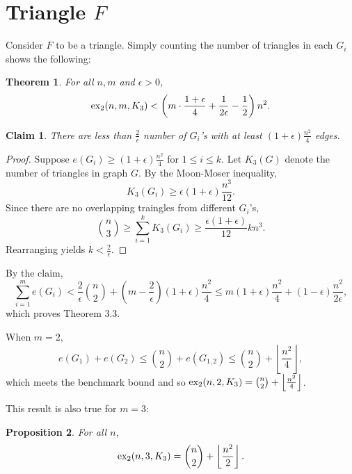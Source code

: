 \documentclass[12pt]{report}
\newtheorem{theorem}{Theorem}[chapter]
\newtheorem{claim}{Claim}[theorem]
\newtheorem{proposition}[theorem]{Proposition}
\newcommand*{\dex}{\textnormal{ex}_2}
\begin{document}
\section{Triangle $F$}

Consider $F$ to be a triangle. Simply counting the number of triangles in each $G_i$ shows the following:

\begin{theorem}
  For all $n, m$ and $\epsilon > 0$,
  \[
    \dex(n, m, K_3) < \left(m \cdot \frac{1 + \epsilon}{4} + \frac{1}{2\epsilon} - \frac{1}{2}\right)n^2.
  \]
\end{theorem}

\begin{claim}
	There are less than $\frac{2}{\epsilon}$ number of $G_i$'s with at least $(1 + \epsilon)\frac{n^2}{4}$ edges.
\end{claim}

\begin{proof}
	Suppose $e(G_i) \geq (1 + \epsilon)\frac{n^2}{4}$ for $1\leq i \leq k$. Let $K_3(G)$ denote the number of triangles in graph $G$. By the Moon-Moser inequality,
	\[
		K_3(G_i) \geq \epsilon(1 + \epsilon)\frac{n^3}{12}.
	\]
	Since there are no overlapping traingles from different $G_i$'s, 
	\[
		\binom{n}{3} \geq \sum_{i = 1}^k K_3(G_i) \geq \frac{\epsilon(1 + \epsilon)}{12}kn^3.
	\]
	Rearranging yields $k < \frac{2}{\epsilon}$.
\end{proof}

By the claim, 
\[
  \sum_{i = 1}^m e(G_i) < \frac{2}{\epsilon}\binom{n}{2} + \left(m - \frac{2}{\epsilon}\right)(1 + \epsilon)\frac{n^2}{4} \leq m(1 + \epsilon)\frac{n^2}{4} + (1 - \epsilon)\frac{n^2}{2\epsilon},
\]
which proves Theorem 3.3.

When $m = 2$, 
\[
	e(G_1) + e(G_2) \leq \binom{n}{2} + e(G_{1, 2}) \leq \binom{n}{2} + \left\lfloor \frac{n^2}{4} \right\rfloor,
\]
which meets the benchmark bound and so $\dex(n, 2, K_3) = \binom{n}{2} + \left\lfloor \frac{n^2}{4} \right\rfloor$.

This result is also true for $m = 3$:

\begin{proposition}
  For all $n$,
  \[
    \dex(n, 3, K_3) = \binom{n}{2} + \left\lfloor \frac{n^2}{2} \right\rfloor.
  \]
\end{proposition}
\end{document}
